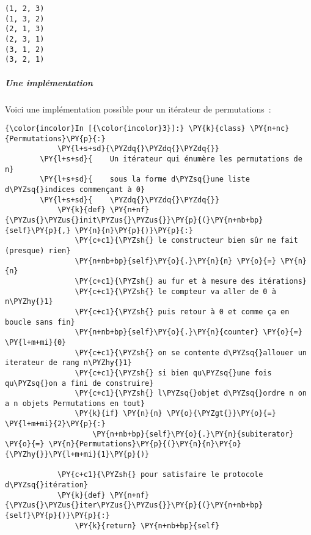     \begin{Verbatim}[commandchars=\\\{\}]
(1, 2, 3)
(1, 3, 2)
(2, 1, 3)
(2, 3, 1)
(3, 1, 2)
(3, 2, 1)

    \end{Verbatim}

    \hypertarget{une-impluxe9mentation}{%
\subparagraph{Une implémentation}\label{une-impluxe9mentation}}

    Voici une implémentation possible pour un itérateur de permutations~:

    \begin{Verbatim}[commandchars=\\\{\}]
{\color{incolor}In [{\color{incolor}3}]:} \PY{k}{class} \PY{n+nc}{Permutations}\PY{p}{:}
            \PY{l+s+sd}{\PYZdq{}\PYZdq{}\PYZdq{}}
        \PY{l+s+sd}{    Un itérateur qui énumère les permutations de n}
        \PY{l+s+sd}{    sous la forme d\PYZsq{}une liste d\PYZsq{}indices commençant à 0}
        \PY{l+s+sd}{    \PYZdq{}\PYZdq{}\PYZdq{}}
            \PY{k}{def} \PY{n+nf}{\PYZus{}\PYZus{}init\PYZus{}\PYZus{}}\PY{p}{(}\PY{n+nb+bp}{self}\PY{p}{,} \PY{n}{n}\PY{p}{)}\PY{p}{:}
                \PY{c+c1}{\PYZsh{} le constructeur bien sûr ne fait (presque) rien}
                \PY{n+nb+bp}{self}\PY{o}{.}\PY{n}{n} \PY{o}{=} \PY{n}{n}
                \PY{c+c1}{\PYZsh{} au fur et à mesure des itérations}
                \PY{c+c1}{\PYZsh{} le compteur va aller de 0 à n\PYZhy{}1}
                \PY{c+c1}{\PYZsh{} puis retour à 0 et comme ça en boucle sans fin}
                \PY{n+nb+bp}{self}\PY{o}{.}\PY{n}{counter} \PY{o}{=} \PY{l+m+mi}{0}
                \PY{c+c1}{\PYZsh{} on se contente d\PYZsq{}allouer un iterateur de rang n\PYZhy{}1}
                \PY{c+c1}{\PYZsh{} si bien qu\PYZsq{}une fois qu\PYZsq{}on a fini de construire}
                \PY{c+c1}{\PYZsh{} l\PYZsq{}objet d\PYZsq{}ordre n on a n objets Permutations en tout}
                \PY{k}{if} \PY{n}{n} \PY{o}{\PYZgt{}}\PY{o}{=} \PY{l+m+mi}{2}\PY{p}{:}
                    \PY{n+nb+bp}{self}\PY{o}{.}\PY{n}{subiterator} \PY{o}{=} \PY{n}{Permutations}\PY{p}{(}\PY{n}{n}\PY{o}{\PYZhy{}}\PY{l+m+mi}{1}\PY{p}{)}
        
            \PY{c+c1}{\PYZsh{} pour satisfaire le protocole d\PYZsq{}itération}
            \PY{k}{def} \PY{n+nf}{\PYZus{}\PYZus{}iter\PYZus{}\PYZus{}}\PY{p}{(}\PY{n+nb+bp}{self}\PY{p}{)}\PY{p}{:}
                \PY{k}{return} \PY{n+nb+bp}{self}
        

\end{Verbatim}

